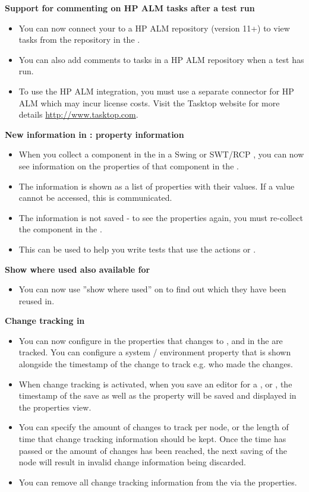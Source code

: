 \textbf{Support for commenting on HP ALM tasks after a test run}
\begin{itemize}
\item You can now connect your \ite{} to a HP ALM repository (version 11+) to view tasks from the repository in the \ite{}.
\item You can also add comments to tasks in a HP ALM repository when a test has run.
\item To use the HP ALM integration, you must use a separate connector for HP ALM which may incur license costs. Visit the Tasktop website for more details \url{http://www.tasktop.com}.
\end{itemize} 


\textbf{New information in \gdomm{} : property information}
\begin{itemize}
\item When you collect a component in the \gdomm{} in a Swing or SWT/RCP \gdaut{}, you can now see information on the properties of that component in the \gdpropview{}.
\item The information is shown as a list of properties with their values. If a value cannot be accessed, this is communicated.
\item The information is not saved - to see the properties again, you must re-collect the component in the \gdomm{}.
\item This can be used to help you write tests that use the actions  or .
\end{itemize}

\textbf{Show where used also available for \gdsuites{}}
\begin{itemize}
\item You can now use ''show where used'' on \gdsuites{} to find out which \gdjobs{} they have been reused in.
\end{itemize}

\textbf{Change tracking in \gdprojects{}}
\begin{itemize}
\item You can now configure in the \gdproject{} properties that changes to \gdcases{}, \gdsuites{} and \gdjobs{} in the \gdproject{} are tracked. You can configure a system / environment property that is shown alongside the timestamp of the change to track e.g. who made the changes. 
\item When change tracking is activated, when you save an editor for a \gdcase{}, \gdsuite{} or \gdjob{}, the timestamp of the save as well as the property will be saved and displayed in the properties view.
\item You can specify the amount of changes to track per node, or the length of time that change tracking information should be kept. Once the time has passed or the amount of changes has been reached, the next saving of the node will result in invalid change information being discarded.
\item You can remove all change tracking information from the \gdproject{} via the \gdproject{} properties. 
\end{itemize}

